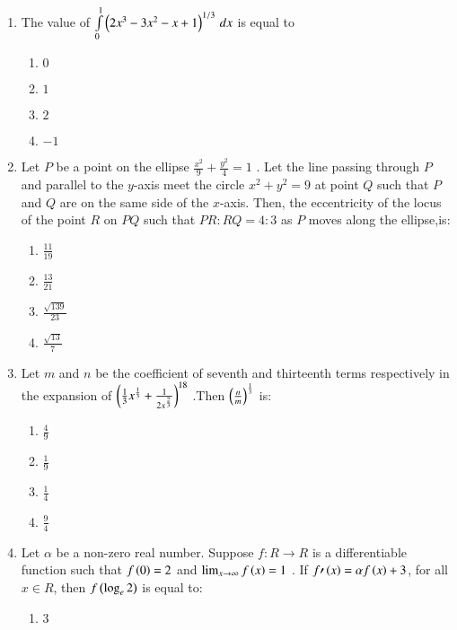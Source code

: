 \documentclass[journal]{IEEEtran}
\begin{document}
\begin{enumerate}
{}
\item{
The value of $\int\limits_{0}^{1}\left(2x^3-3x^2-x+1\right)^{1/3}\,dx$ is equal to
\begin{multicols}{4}
\begin{enumerate}
\item $0$
\item $1$
\item $2$
\item $-1$
\end{enumerate}
\end{multicols}
}
\item{
Let $P$ be a point on the ellipse $\frac{x^2}{9}+\frac{y^2}{4}=1$ . Let the line passing through $P$ and parallel to the $y$-axis meet the circle $x^2+y^2=9$ at point $Q$ such that $P$ and $Q$ are on the same side of the $x$-axis. Then, the eccentricity of the locus of the point $R$ on $PQ$ such that $PR:RQ=4:3$ as $P$ moves along the ellipse,is:
\begin{multicols}{4}
\begin{enumerate}
\item $\frac{11}{19}$
\item $\frac{13}{21}$
\item $\frac{\sqrt{139}}{23}$
\item $\frac{\sqrt{13}}{7}$
\end{enumerate}
\end{multicols}
}
\item{
Let $m$ and $n$ be the coefficient of seventh and thirteenth terms respectively in the expansion of $\left(\frac{1}{3}x^{\frac{1}{3}}+\frac{1}{2x^\frac{2}{3}}\right)^{18}$ .Then $\left(\frac{n}{m}\right)^\frac{1}{3}$ is:
\begin{multicols}{4}
\begin{enumerate}
\item $\frac{4}{9}$
\item $\frac{1}{9}$
\item $\frac{1}{4}$
\item $\frac{9}{4}$
\end{enumerate}
\end{multicols}
}
\item{
Let $\alpha$ be a non-zero real number. Suppose $f:R\to R$ is a differentiable function such that $f\left(0\right)=2$ and $\lim_{x\to\infty}f\left(x\right)=1$ . If $f\prime\left(x\right)=\alpha f\left(x\right)+3$, for all $x\in R$, then $f\left(\log_e2\right)$ is equal to:
\begin{multicols}{4}
\begin{enumerate}
\item $3$

\end{enumerate}
\end{multicols}}
\end{enumerate}
\end{document}
